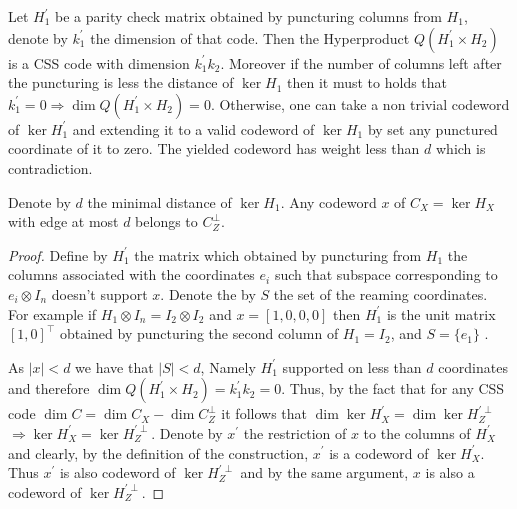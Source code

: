 \begin{remark}
  \label{remark:pun}
  Let $H_{1}^{\prime}$ be a parity check matrix obtained by puncturing columns from $H_{1}$, denote by $k^{\prime}_{1}$ the dimension of that code. Then the Hyperproduct $Q(H_{1}^{\prime}\times H_{2})$ is a CSS code with dimension $k^{\prime}_{1}k_{2}$. Moreover if the number of columns left after the puncturing is less the distance of $\ker H_{1}$ then it must to holds that $k^{\prime}_{1} = 0 \Rightarrow \dim Q(H_{1}^{\prime} \times H_{2}) = 0$. Otherwise, one can take a non trivial codeword of $\ker H^{\prime}_{1}$ and extending it to a valid codeword of $\ker H_{1}$ by set any punctured coordinate of it to zero. The yielded codeword has weight less than $d$ which is contradiction.  
\end{remark}

\begin{claim}
  \label{claim:Hdis}
  Denote by $d$ the minimal distance of $\ker H_{1}$. Any codeword $x$ of $C_{X} = \ker H_{X}$ with edge at most $d$ belongs to $C_{Z}^{\perp}$.  
\end{claim}

\begin{proof}
  Define by $H^{\prime}_{1}$ the matrix which obtained by puncturing from $H_{1}$ the columns  associated with the coordinates $e_{i}$ such that subspace corresponding to $ e_{i} \otimes I_{n} $ doesn't support $x$. Denote the by $S$ the set of the reaming coordinates.  For example if $ H_{1} \otimes I_{n} = I_{2} \otimes I_{2}$ and $x = [1,0,0,0]$ then $H^{\prime}_{1} $ is the unit matrix $[1 , 0]^\top$ obtained by puncturing the second column of $H_{1} = I_{2}$, and $S= \{ e_{1} \} $ .  


  As $|x| < d $ we have that $|S| < d$, Namely $H^{\prime}_{1}$ supported on less than $d$ coordinates and therefore $\dim Q\left( H^{\prime}_{1} \times H_{2} \right)= k^{\prime}_{1}k_{2} = 0$.  Thus, by the fact that for any CSS code $\dim C = \dim C_{X} - \dim C_{Z}^\perp$ it follows that $\dim \ker H_{X}^{\prime}  = \dim \ker H_{Z}^{\prime \perp}$ $ \Rightarrow \ker H_{X}^{\prime}  = \ker H_{Z}^{\prime \perp}$.  Denote by $x^{\prime}$ the restriction of $x$ to the columns of $H_{X}^{\prime}$ and clearly, by the definition of the construction,  $x^{\prime}$ is a codeword of $\ker H_{X}^{\prime}$. Thus $x^{\prime}$ is also codeword of $\ker H_{Z}^{\prime \perp}$ and by the same argument, $x$ is also a codeword of $\ker H_{Z}^{\prime \perp}$. 
\end{proof}

